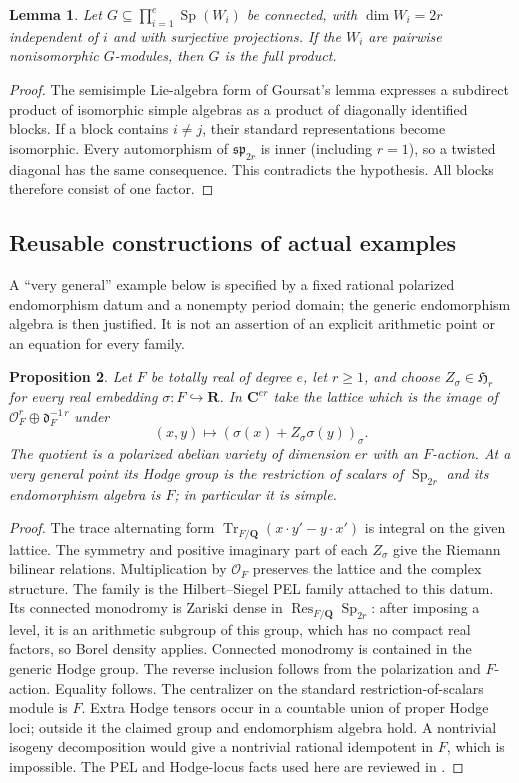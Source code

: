 \documentclass[10pt,reqno]{article}
\theoremstyle{emphasizedplain}
\theoremstyle{emphasizeddefinition}
\theoremstyle{emphasizeddefinition}
\newtheorem{prelemma}{Lemma}
\newtheorem{preproposition}[prelemma]{Proposition}
\DeclareMathOperator{\Sp}{Sp}
\DeclareMathOperator{\Res}{Res}
\DeclareMathOperator{\Tr}{Tr}
\newcommand{\Q}{\mathbf Q}
\newcommand{\C}{\mathbf C}
\newcommand{\R}{\mathbf R}
\begin{document}
\begin{prelemma}\label{p:goursat}
Let $G\subseteq\prod_{i=1}^e\Sp(W_i)$ be connected, with $\dim W_i=2r$
independent of $i$ and with surjective projections. If the $W_i$ are
pairwise nonisomorphic $G$-modules, then $G$ is the full product.
\end{prelemma}
\begin{proof}
The semisimple Lie-algebra form of Goursat's lemma expresses a subdirect
product of isomorphic simple algebras as a product of diagonally identified
blocks. If a block contains $i\ne j$, their standard representations become
isomorphic. Every automorphism of $\mathfrak{sp}_{2r}$ is inner (including
$r=1$), so a twisted diagonal has the same consequence. This contradicts
the hypothesis. All blocks therefore consist of one factor.
\end{proof}

\subsection*{Reusable constructions of actual examples}
A ``very general'' example below is specified by a fixed rational
polarized endomorphism datum and a nonempty period domain; the generic
endomorphism algebra is then justified. It is not an assertion of an
explicit arithmetic point or an equation for every family.

\begin{preproposition}\label{p:realconstruction}
Let $F$ be totally real of degree $e$, let $r\geq1$, and choose
$Z_\sigma\in\mathfrak H_r$ for every real embedding $\sigma:F\hookrightarrow\R$.
In $\C^{er}$ take the lattice which is the image of
$\mathcal O_F^r\oplus\mathfrak d_F^{-1\,r}$ under
\[
 (x,y)\longmapsto(\sigma(x)+Z_\sigma\sigma(y))_\sigma .
\]
The quotient is a polarized abelian variety of dimension $er$ with an
$F$-action. At a very general point its Hodge group is the restriction of
scalars of $\Sp_{2r}$ and its endomorphism algebra is $F$; in particular it
is simple.
\end{preproposition}
\begin{proof}
The trace alternating form
$\Tr_{F/\Q}(x\cdot y'-y\cdot x')$ is integral on the given lattice. The
symmetry and positive imaginary part of each $Z_\sigma$ give the Riemann
bilinear relations. Multiplication by $\mathcal O_F$ preserves the lattice
and the complex structure. The family is the Hilbert--Siegel PEL family
attached to this datum. Its connected monodromy is Zariski dense in
$\Res_{F/\Q}\Sp_{2r}$: after imposing a level, it is an arithmetic subgroup
of this group, which has no compact real factors, so Borel density applies.
Connected monodromy is contained in the generic Hodge group. The reverse
inclusion follows from the polarization and $F$-action. Equality follows.
The centralizer on the standard restriction-of-scalars module is $F$.
Extra Hodge tensors occur in a countable union of proper Hodge loci;
outside it the claimed group and endomorphism algebra hold. A nontrivial
isogeny decomposition would give a nontrivial rational idempotent in $F$,
which is impossible. The PEL and Hodge-locus facts used here are reviewed in
\cite{Moonen}.
\end{proof}
\end{document}
